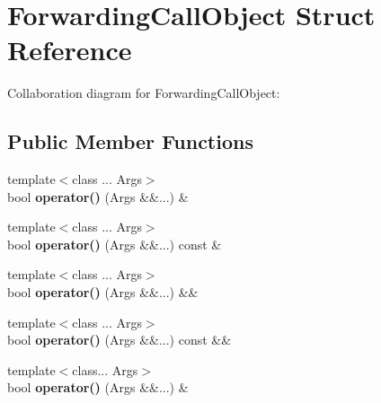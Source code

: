 \hypertarget{struct_forwarding_call_object}{}\section{Forwarding\+Call\+Object Struct Reference}
\label{struct_forwarding_call_object}


Collaboration diagram for Forwarding\+Call\+Object\+:
\subsection*{Public Member Functions}
\begin{DoxyCompactItemize}
\item 
\mbox{\label{struct_forwarding_call_object_a5ba444a07ca4e0c2f7ae2a7a12698e0b}} 
{\footnotesize template$<$class ... Args$>$ }\\bool {\bfseries operator()} (Args \&\&...) \&
\item 
\mbox{\label{struct_forwarding_call_object_ad126824bca01f72e82cceadd1744244c}} 
{\footnotesize template$<$class ... Args$>$ }\\bool {\bfseries operator()} (Args \&\&...) const \&
\item 
\mbox{\label{struct_forwarding_call_object_ac4d7f1e653669ab822ffc365dc4a0d66}} 
{\footnotesize template$<$class ... Args$>$ }\\bool {\bfseries operator()} (Args \&\&...) \&\&
\item 
\mbox{\label{struct_forwarding_call_object_acc740392b5a8975461a889fe1562c402}} 
{\footnotesize template$<$class ... Args$>$ }\\bool {\bfseries operator()} (Args \&\&...) const \&\&
\item 
\mbox{\label{struct_forwarding_call_object_a5ba444a07ca4e0c2f7ae2a7a12698e0b}} 
{\footnotesize template$<$class... Args$>$ }\\bool {\bfseries operator()} (Args \&\&...) \&
\item 
\mbox{\label{struct_forwarding_call_object_ad126824bca01f72e82cceadd1744244c}} 

\end{DoxyCompactItemize}
